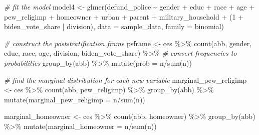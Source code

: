 \documentclass[
]{article}
\newenvironment{Shaded}{\begin{snugshade}}{\end{snugshade}}
\newcommand{\AttributeTok}[1]{\textcolor[rgb]{0.77,0.63,0.00}{#1}}
\newcommand{\CommentTok}[1]{\textcolor[rgb]{0.56,0.35,0.01}{\textit{#1}}}
\newcommand{\DecValTok}[1]{\textcolor[rgb]{0.00,0.00,0.81}{#1}}
\newcommand{\FunctionTok}[1]{\textcolor[rgb]{0.00,0.00,0.00}{#1}}
\newcommand{\NormalTok}[1]{#1}
\newcommand{\OtherTok}[1]{\textcolor[rgb]{0.56,0.35,0.01}{#1}}
\newcommand{\SpecialCharTok}[1]{\textcolor[rgb]{0.00,0.00,0.00}{#1}}
\newcommand{\StringTok}[1]{\textcolor[rgb]{0.31,0.60,0.02}{#1}}
\begin{document}
\begin{Shaded}
\begin{Highlighting}[]
\CommentTok{\# fit the model}
\NormalTok{model4 }\OtherTok{\textless{}{-}} \FunctionTok{glmer}\NormalTok{(defund\_police }\SpecialCharTok{\textasciitilde{}}\NormalTok{  gender }\SpecialCharTok{+}\NormalTok{ educ }\SpecialCharTok{+}\NormalTok{ race }\SpecialCharTok{+}\NormalTok{ age }\SpecialCharTok{+} 
\NormalTok{                  pew\_religimp }\SpecialCharTok{+}\NormalTok{ homeowner }\SpecialCharTok{+}\NormalTok{ urban }\SpecialCharTok{+} 
\NormalTok{                  parent }\SpecialCharTok{+}\NormalTok{ military\_household }\SpecialCharTok{+} 
\NormalTok{                  (}\DecValTok{1} \SpecialCharTok{+}\NormalTok{ biden\_vote\_share }\SpecialCharTok{|}\NormalTok{ division),}
                \AttributeTok{data =}\NormalTok{ sample\_data,}
                \AttributeTok{family =} \StringTok{\textquotesingle{}binomial\textquotesingle{}}\NormalTok{)}

\CommentTok{\# construct the poststratification frame}
\NormalTok{psframe }\OtherTok{\textless{}{-}}\NormalTok{ ces }\SpecialCharTok{\%\textgreater{}\%}
  \FunctionTok{count}\NormalTok{(abb, gender, educ, race, age, }
\NormalTok{        division, biden\_vote\_share) }\SpecialCharTok{\%\textgreater{}\%} 
  \CommentTok{\# convert frequencies to probabilities}
  \FunctionTok{group\_by}\NormalTok{(abb) }\SpecialCharTok{\%\textgreater{}\%} 
  \FunctionTok{mutate}\NormalTok{(}\AttributeTok{prob =}\NormalTok{ n}\SpecialCharTok{/}\FunctionTok{sum}\NormalTok{(n))}

\CommentTok{\# find the marginal distribution for each new variable}
\NormalTok{marginal\_pew\_religimp }\OtherTok{\textless{}{-}}\NormalTok{ ces }\SpecialCharTok{\%\textgreater{}\%} 
  \FunctionTok{count}\NormalTok{(abb, pew\_religimp) }\SpecialCharTok{\%\textgreater{}\%} 
  \FunctionTok{group\_by}\NormalTok{(abb) }\SpecialCharTok{\%\textgreater{}\%} 
  \FunctionTok{mutate}\NormalTok{(}\AttributeTok{marginal\_pew\_religimp =}\NormalTok{ n}\SpecialCharTok{/}\FunctionTok{sum}\NormalTok{(n))}

\NormalTok{marginal\_homeowner }\OtherTok{\textless{}{-}}\NormalTok{ ces }\SpecialCharTok{\%\textgreater{}\%} 
  \FunctionTok{count}\NormalTok{(abb, homeowner) }\SpecialCharTok{\%\textgreater{}\%} 
  \FunctionTok{group\_by}\NormalTok{(abb) }\SpecialCharTok{\%\textgreater{}\%} 
  \FunctionTok{mutate}\NormalTok{(}\AttributeTok{marginal\_homeowner =}\NormalTok{ n}\SpecialCharTok{/}\FunctionTok{sum}\NormalTok{(n))}


\end{Highlighting}
\end{Shaded}
\end{document}
